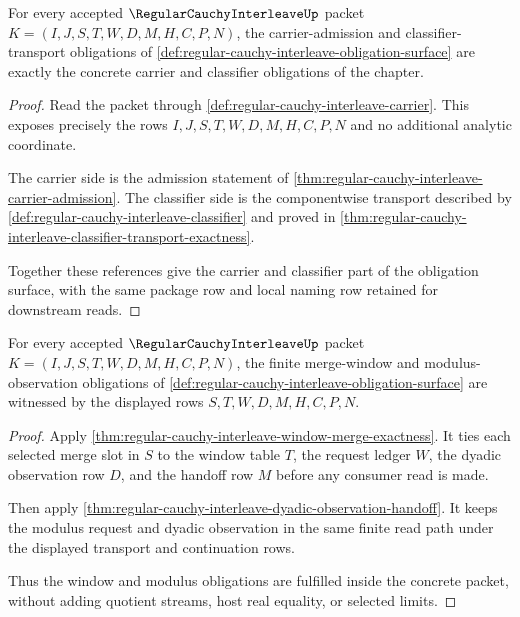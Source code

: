\begin{theorem}
\label{thm:regular-cauchy-interleave-obligation-carrier-classifier-package}
For every accepted $\RegularCauchyInterleaveUp$ packet $K=(I,J,S,T,W,D,M,H,C,P,N)$, the carrier-admission and classifier-transport obligations of \autoref{def:regular-cauchy-interleave-obligation-surface} are exactly the concrete carrier and classifier obligations of the chapter.
\end{theorem}
\begin{proof}
Read the packet through \autoref{def:regular-cauchy-interleave-carrier}. This exposes precisely the rows $I,J,S,T,W,D,M,H,C,P,N$ and no additional analytic coordinate.

The carrier side is the admission statement of \autoref{thm:regular-cauchy-interleave-carrier-admission}. The classifier side is the componentwise transport described by \autoref{def:regular-cauchy-interleave-classifier} and proved in \autoref{thm:regular-cauchy-interleave-classifier-transport-exactness}.

Together these references give the carrier and classifier part of the obligation surface, with the same package row and local naming row retained for downstream reads.
\end{proof}

\begin{theorem}
\label{thm:regular-cauchy-interleave-obligation-window-modulus-package}
For every accepted $\RegularCauchyInterleaveUp$ packet $K=(I,J,S,T,W,D,M,H,C,P,N)$, the finite merge-window and modulus-observation obligations of \autoref{def:regular-cauchy-interleave-obligation-surface} are witnessed by the displayed rows $S,T,W,D,M,H,C,P,N$.
\end{theorem}
\begin{proof}
Apply \autoref{thm:regular-cauchy-interleave-window-merge-exactness}. It ties each selected merge slot in $S$ to the window table $T$, the request ledger $W$, the dyadic observation row $D$, and the handoff row $M$ before any consumer read is made.

Then apply \autoref{thm:regular-cauchy-interleave-dyadic-observation-handoff}. It keeps the modulus request and dyadic observation in the same finite read path under the displayed transport and continuation rows.

Thus the window and modulus obligations are fulfilled inside the concrete packet, without adding quotient streams, host real equality, or selected limits.
\end{proof}


